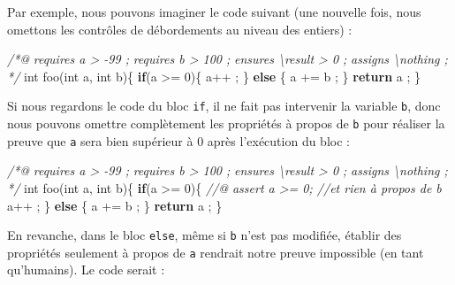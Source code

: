 \documentclass[12pt,francais,]{scrbook}
\newenvironment{Shaded}{}{}
\newcommand{\KeywordTok}[1]{\textcolor[rgb]{0.00,0.44,0.13}{\textbf{{#1}}}}
\newcommand{\DataTypeTok}[1]{\textcolor[rgb]{0.56,0.13,0.00}{{#1}}}
\newcommand{\DecValTok}[1]{\textcolor[rgb]{0.25,0.63,0.44}{{#1}}}
\newcommand{\CommentTok}[1]{\textcolor[rgb]{0.38,0.63,0.69}{\textit{{#1}}}}
\newcommand{\NormalTok}[1]{{#1}}
\begin{document}
Par exemple, nous pouvons imaginer le code suivant (une nouvelle fois,
nous omettons les contrôles de débordements au niveau des entiers) :

\begin{footnotesize}\begin{Shaded}
\begin{Highlighting}[]
\CommentTok{/*@}
\CommentTok{  requires a > -99 ;}
\CommentTok{  requires b > 100 ;}
\CommentTok{  ensures  \textbackslash{}result > 0 ;}
\CommentTok{  assigns  \textbackslash{}nothing ;}
\CommentTok{*/}
\DataTypeTok{int} \NormalTok{foo(}\DataTypeTok{int} \NormalTok{a, }\DataTypeTok{int} \NormalTok{b)\{}
  \KeywordTok{if}\NormalTok{(a >= }\DecValTok{0}\NormalTok{)\{}
    \NormalTok{a++ ;}
  \NormalTok{\} }\KeywordTok{else} \NormalTok{\{}
    \NormalTok{a += b ;}
  \NormalTok{\}}
  \KeywordTok{return} \NormalTok{a ;}
\NormalTok{\}}
\end{Highlighting}
\end{Shaded}\end{footnotesize}

Si nous regardons le code du bloc \texttt{if}, il ne fait pas intervenir
la variable \texttt{b}, donc nous pouvons omettre complètement les
propriétés à propos de \texttt{b} pour réaliser la preuve que \texttt{a}
sera bien supérieur à 0 après l'exécution du bloc :

\begin{footnotesize}\begin{Shaded}
\begin{Highlighting}[]
\CommentTok{/*@}
\CommentTok{  requires a > -99 ;}
\CommentTok{  requires b > 100 ;}
\CommentTok{  ensures  \textbackslash{}result > 0 ;}
\CommentTok{  assigns  \textbackslash{}nothing ;}
\CommentTok{*/}
\DataTypeTok{int} \NormalTok{foo(}\DataTypeTok{int} \NormalTok{a, }\DataTypeTok{int} \NormalTok{b)\{}
  \KeywordTok{if}\NormalTok{(a >= }\DecValTok{0}\NormalTok{)\{}
    \CommentTok{//@ assert a >= 0; //et rien à propos de b}
    \NormalTok{a++ ;}
  \NormalTok{\} }\KeywordTok{else} \NormalTok{\{}
    \NormalTok{a += b ;}
  \NormalTok{\}}
  \KeywordTok{return} \NormalTok{a ;}
\NormalTok{\}}
\end{Highlighting}
\end{Shaded}\end{footnotesize}

En revanche, dans le bloc \texttt{else}, même si \texttt{b} n'est pas
modifiée, établir des propriétés seulement à propos de \texttt{a}
rendrait notre preuve impossible (en tant qu'humains). Le code serait :
\end{document}
